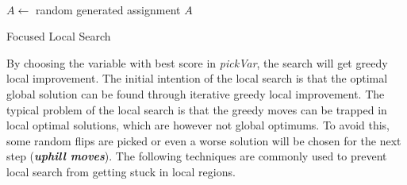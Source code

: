 \documentclass[12pt,a4paper,twoside]{scrartcl}
\numberwithin{equation}{section}
\begin{document}
\\
\begin{algorithm}[h!]
  $A \leftarrow$ random generated assignment  $A$\;
 \caption{Focused Local Search}
\end{algorithm}  

By choosing the variable with best score in \emph{pickVar}, the search will get greedy local improvement. 
The initial intention of the local search is that the optimal global solution can be found through iterative greedy local improvement. The typical problem of the local search is that the greedy moves can be trapped in local optimal solutions, which are however not global optimums. To avoid this, some random flips are picked or even a worse solution  will be chosen for the next step (\emph{\textbf{uphill moves}}). The following techniques are commonly used to prevent local search from getting stuck in local regions.
\end{document}
